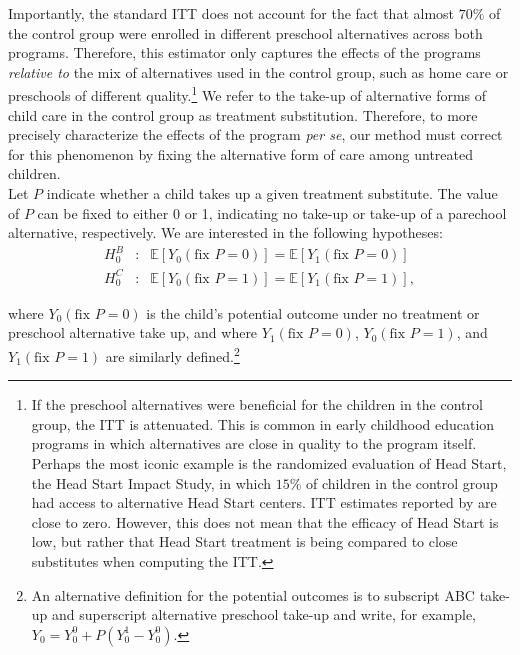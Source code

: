 \noindent Importantly, the standard ITT does not account for the fact that almost $70 \%$ of the control group were enrolled in different preschool alternatives across both programs. Therefore, this estimator only captures the effects of the programs \emph{relative to} the mix of alternatives used in the control group, such as home care or preschools of different quality.\footnote{If the preschool alternatives were beneficial for the children in the control group, the ITT is attenuated. This is common in early childhood education programs in which alternatives are close in quality to the program itself. Perhaps the most iconic example is the randomized evaluation of Head Start, the Head Start Impact Study, in which $15\%$ of children in the control group had access to alternative Head Start centers. ITT estimates reported by \cite{Puma_Bell_etal_2010_HeadStartImpact} are close to zero. However, this does not mean that the efficacy of Head Start is low, but rather that Head Start treatment is being compared to close substitutes when computing the ITT.} We refer to the take-up of alternative forms of child care in the control group as treatment substitution. Therefore, to more precisely characterize the effects of the program \emph{per se}, our method must correct for this phenomenon by fixing the alternative form of care among untreated children. \\

\noindent Let $P$ indicate whether a child takes up a given treatment substitute. The value of $P$ can be fixed to either $0$ or 1, indicating no take-up or take-up of a parechool alternative, respectively. We are interested in the following hypotheses:
\begin{eqnarray}
H_{0}^B &:& \mathbb{E} \left[ Y_{0} \left( \text{fix } P = 0 \right) \right] =  \mathbb{E} \left[ Y_{1} \left( \text{fix } P = 0 \right) \right] \label{eq:hoB} \\
H_{0}^C &:&  \mathbb{E} \left[ Y_{0} \left( \text{fix } P = 1 \right) \right] =  \mathbb{E} \left[ Y_{1} \left( \text{fix } P = 1 \right)  \right] \label{eq:hoC},
\end{eqnarray}

\noindent where $Y_{0} \left( \text{fix } P = 0 \right)$ is the child's potential outcome under no treatment or preschool alternative take up, and where $Y_{1} \left( \text{fix } P = 0 \right)$, $Y_{0} \left( \text{fix } P = 1 \right)$, and $Y_{1} \left( \text{fix } P = 1 \right) $ are similarly defined.\footnote{An alternative definition for the potential outcomes is to subscript ABC take-up and superscript alternative preschool take-up and write, for example, $Y_{0} = Y_{0}^0 + P \left( Y_{0}^1 - Y_{0}^0 \right)$.}\\

